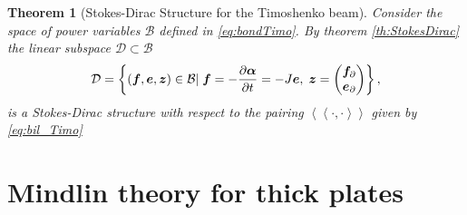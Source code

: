 \documentclass[preprint,12pt]{elsarticle}
\newtheorem{theorem}{Theorem}
\begin{document}
{\begin{theorem}[Stokes-Dirac Structure for the Timoshenko beam]
	Consider the space of power variables $\mathcal{B}$ defined in \eqref{eq:bondTimo}. By theorem \ref{th:StokesDirac} the linear subspace $\mathcal{D} \subset \mathcal{B}$
	\begin{equation}
	\mathcal{D} =  \left\{(\bm{f}, \bm{e},\bm{z}) \in \mathcal{B} | \; \bm{f} = - \diffp{\bm{\alpha}}{t} = -J\bm{e}, \; \bm{z} = \begin{pmatrix} \bm{f}_{\partial} \\ \bm{e}_{\partial} \end{pmatrix} 
 \right\},
	\end{equation}
	is a Stokes-Dirac structure with respect to the pairing $\left\langle \left\langle \cdot, \cdot \right\rangle \right\rangle$ given by \eqref{eq:bil_Timo}
\end{theorem}
}

\section{Mindlin theory for thick plates}
\label{sec:Min_Var}
\end{document}

